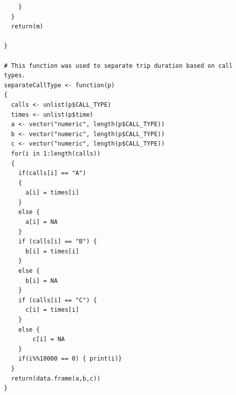 \documentclass[letterpaper, 12 pt, conference]{article}
\begin{document}
\begin{lstlisting}
    }
  }
  return(m)
  
}

# This function was used to separate trip duration based on call types. 
separateCallType <- function(p)
{
  calls <- unlist(p$CALL_TYPE)
  times <- unlist(p$time)
  a <- vector("numeric", length(p$CALL_TYPE))
  b <- vector("numeric", length(p$CALL_TYPE))
  c <- vector("numeric", length(p$CALL_TYPE))
  for(i in 1:length(calls))
  {
    if(calls[i] == "A")
    {
      a[i] = times[i] 
    }
    else {
      a[i] = NA
    }
    if (calls[i] == "B") {
      b[i] = times[i]
    }
    else {
      b[i] = NA
    }
    if (calls[i] == "C") {
      c[i] = times[i]
    }
    else {
        c[i] = NA
    }
    if(i%%10000 == 0) { print(i)}
  }
  return(data.frame(a,b,c))
}
\end{lstlisting}
\end{document}

